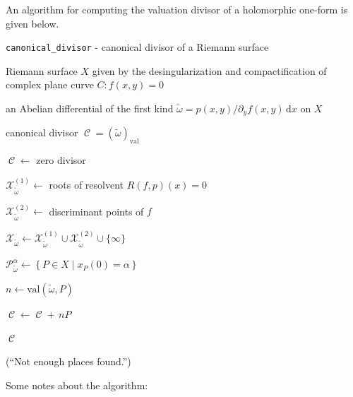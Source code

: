 \documentclass[12pt]{article}
\theoremstyle{definition}
\newcommand{\dx}{\,\mathrm{d}x}
\DeclareMathOperator{\DivC}{\mathcal{C}}
\begin{document}
An algorithm for computing the valuation divisor of a holomorphic
one-form is given below.
\begin{algorithm}[H]
\caption{{\tt canonical\_divisor} - canonical divisor of a Riemann surface}
\label{alg:canonical}
\begin{algorithmic}[1]
  \Require Riemann surface $X$ given by the desingularization and
  compactification of complex plane curve $C : f(x,y) = 0$

  \Require an Abelian differential of the first kind $\tilde{\omega} =
  p(x,y) / \partial_y f(x,y) \dx$ on $X$

  \Ensure canonical divisor $\DivC = (\tilde{\omega})_\text{val}$

  \State $\DivC \gets$ zero divisor

  \State $\mathcal{X}_{\tilde{\omega}}^{(1)} \gets$ roots of resolvent
  $R(f,p)(x) = 0$

  \State $\mathcal{X}_{\tilde{\omega}}^{(2)} \gets$ discriminant points of $f$

  \State $\mathcal{X}_{\tilde{\omega}} \gets
  \mathcal{X}_{\tilde{\omega}}^{(1)} \cup
  \mathcal{X}_{\tilde{\omega}}^{(2)} \cup \{ \infty \}$


  \State $\mathcal{P}_{\tilde{\omega}}^\alpha \gets \left\{ P \in X \; |
  \; x_P(0) = \alpha \right\}$


  \State $n \gets \text{val}\left(\tilde{\omega},P\right)$

  \State $\DivC \gets \DivC + \,n P$

  \If{$\deg \DivC = 2g - 2$}
  \State \Return $\DivC$
  \EndIf

  \EndFor

  \EndFor

  (``Not enough places found.'')

\end{algorithmic}
\end{algorithm}
Some notes about the algorithm:
\end{document}
